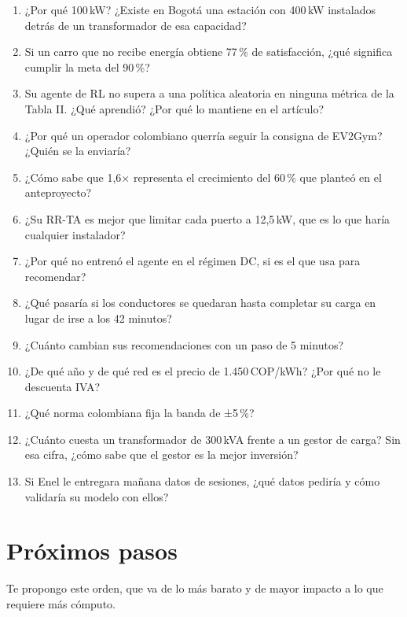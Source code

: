 \documentclass[11pt]{article}
\begin{document}
\begin{enumerate}[itemsep=4pt]
\item ¿Por qué 100\,kW? ¿Existe en Bogotá una estación con 400\,kW instalados detrás de un transformador de esa capacidad?
\item Si un carro que no recibe energía obtiene 77\,\% de satisfacción, ¿qué significa cumplir la meta del 90\,\%?
\item Su agente de RL no supera a una política aleatoria en ninguna métrica de la Tabla II. ¿Qué aprendió? ¿Por qué lo mantiene en el artículo?
\item ¿Por qué un operador colombiano querría seguir la consigna de EV2Gym? ¿Quién se la enviaría?
\item ¿Cómo sabe que 1,6× representa el crecimiento del 60\,\% que planteó en el anteproyecto?
\item ¿Su RR-TA es mejor que limitar cada puerto a 12,5\,kW, que es lo que haría cualquier instalador?
\item ¿Por qué no entrenó el agente en el régimen DC, si es el que usa para recomendar?
\item ¿Qué pasaría si los conductores se quedaran hasta completar su carga en lugar de irse a los 42 minutos?
\item ¿Cuánto cambian sus recomendaciones con un paso de 5 minutos?
\item ¿De qué año y de qué red es el precio de 1.450\,COP/kWh? ¿Por qué no le descuenta IVA?
\item ¿Qué norma colombiana fija la banda de ±5\,\%?
\item ¿Cuánto cuesta un transformador de 300\,kVA frente a un gestor de carga? Sin esa cifra, ¿cómo sabe que el gestor es la mejor inversión?
\item Si Enel le entregara mañana datos de sesiones, ¿qué datos pediría y cómo validaría su modelo con ellos?
\end{enumerate}

\section{Próximos pasos}

Te propongo este orden, que va de lo más barato y de mayor impacto a lo que requiere más cómputo.
\end{document}
